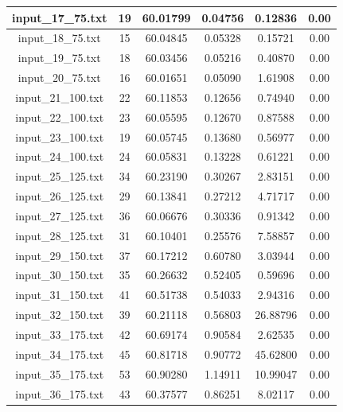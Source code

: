 \begin{center}
\begin{tabular}{|c|c|c|c|c|c|}
		input\_17\_75.txt & 19 & 60.01799 & 0.04756 & 0.12836 & 0.00\\\hline
		input\_18\_75.txt & 15 & 60.04845 & 0.05328 & 0.15721 & 0.00\\\hline
		input\_19\_75.txt & 18 & 60.03456 & 0.05216 & 0.40870 & 0.00\\\hline
		input\_20\_75.txt & 16 & 60.01651 & 0.05090 & 1.61908 & 0.00\\\hline
		input\_21\_100.txt & 22 & 60.11853 & 0.12656 & 0.74940 & 0.00\\\hline
		input\_22\_100.txt & 23 & 60.05595 & 0.12670 & 0.87588 & 0.00\\\hline
		input\_23\_100.txt & 19 & 60.05745 & 0.13680 & 0.56977 & 0.00\\\hline
		input\_24\_100.txt & 24 & 60.05831 & 0.13228 & 0.61221 & 0.00\\\hline
		input\_25\_125.txt & 34 & 60.23190 & 0.30267 & 2.83151 & 0.00\\\hline
		input\_26\_125.txt & 29 & 60.13841 & 0.27212 & 4.71717 & 0.00\\\hline
		input\_27\_125.txt & 36 & 60.06676 & 0.30336 & 0.91342 & 0.00\\\hline
		input\_28\_125.txt & 31 & 60.10401 & 0.25576 & 7.58857 & 0.00\\\hline
		input\_29\_150.txt & 37 & 60.17212 & 0.60780 & 3.03944 & 0.00\\\hline
		input\_30\_150.txt & 35 & 60.26632 & 0.52405 & 0.59696 & 0.00\\\hline
		input\_31\_150.txt & 41 & 60.51738 & 0.54033 & 2.94316 & 0.00\\\hline
		input\_32\_150.txt & 39 & 60.21118 & 0.56803 & 26.88796 & 0.00\\\hline
		input\_33\_175.txt & 42 & 60.69174 & 0.90584 & 2.62535 & 0.00\\\hline
		input\_34\_175.txt & 45 & 60.81718 & 0.90772 & 45.62800 & 0.00\\\hline
		input\_35\_175.txt & 53 & 60.90280 & 1.14911 & 10.99047 & 0.00\\\hline
		input\_36\_175.txt & 43 & 60.37577 & 0.86251 & 8.02117 & 0.00\\\hline
	\end{tabular}
\end{center}

\pagebreak


